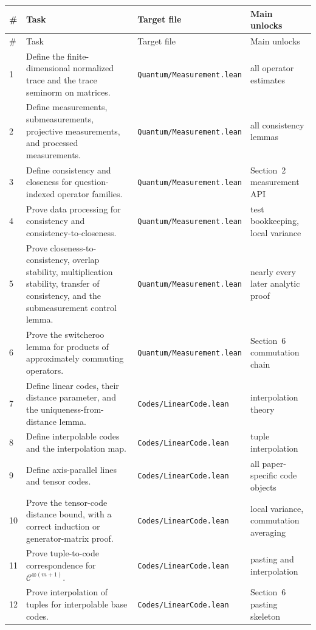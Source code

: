 \documentclass{article}
\theoremstyle{remark}
\newcommand{\code}{\mathcal{C}}
\begin{document}
\small
\begin{longtable}{L{0.05\textwidth}L{0.49\textwidth}L{0.23\textwidth}L{0.17\textwidth}}
\toprule
\# & Task & Target file & Main unlocks \\
\midrule
\endfirsthead
\toprule
\# & Task & Target file & Main unlocks \\
\midrule
{} & Define the finite-dimensional normalized trace and the trace seminorm on matrices. & \texttt{Quantum/Measurement.lean} & all operator estimates \\
2 & Define measurements, submeasurements, projective measurements, and processed measurements. & \texttt{Quantum/Measurement.lean} & all consistency lemmas \\
3 & Define consistency and closeness for question-indexed operator families. & \texttt{Quantum/Measurement.lean} & Section~2 measurement API \\
4 & Prove data processing for consistency and consistency-to-closeness. & \texttt{Quantum/Measurement.lean} & test bookkeeping, local variance \\
5 & Prove closeness-to-consistency, overlap stability, multiplication stability, transfer of consistency, and the submeasurement control lemma. & \texttt{Quantum/Measurement.lean} & nearly every later analytic proof \\
6 & Prove the switcheroo lemma for products of approximately commuting operators. & \texttt{Quantum/Measurement.lean} & Section~6 commutation chain \\
7 & Define linear codes, their distance parameter, and the uniqueness-from-distance lemma. & \texttt{Codes/LinearCode.lean} & interpolation theory \\
8 & Define interpolable codes and the interpolation map. & \texttt{Codes/LinearCode.lean} & tuple interpolation \\
9 & Define axis-parallel lines and tensor codes. & \texttt{Codes/LinearCode.lean} & all paper-specific code objects \\
10 & Prove the tensor-code distance bound, with a correct induction or generator-matrix proof. & \texttt{Codes/LinearCode.lean} & local variance, commutation averaging \\
11 & Prove tuple-to-code correspondence for $\code^{\otimes(m+1)}$. & \texttt{Codes/LinearCode.lean} & pasting and interpolation \\
12 & Prove interpolation of tuples for interpolable base codes. & \texttt{Codes/LinearCode.lean} & Section~6 pasting skeleton \\

\end{longtable}
\end{document}
